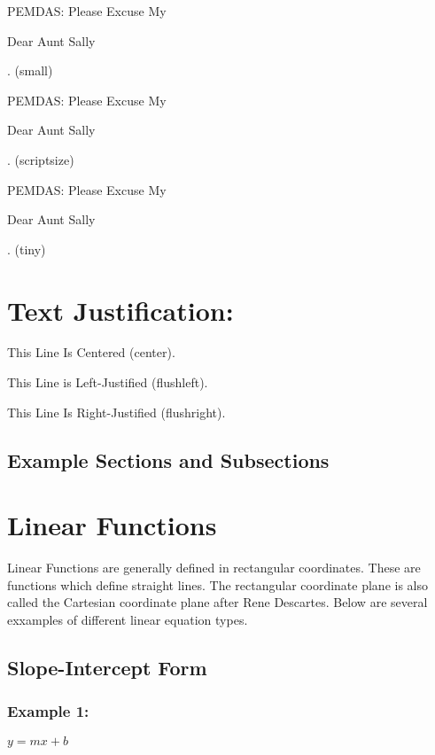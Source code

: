 \documentclass[11pt]{article}
\begin{document}
PEMDAS: Please Excuse My \begin{small}Dear Aunt Sally\end{small}. (small)

PEMDAS: Please Excuse My \begin{scriptsize}Dear Aunt Sally\end{scriptsize}. (scriptsize)

PEMDAS: Please Excuse My \begin{tiny}Dear Aunt Sally\end{tiny}. (tiny)


\section{Text Justification:}
\begin{center}
    This Line Is Centered (center).
\end{center}

\begin{flushleft}
    This Line is Left-Justified (flushleft).
\end{flushleft}

\begin{flushright}
    This Line Is Right-Justified (flushright).
\end{flushright}

\pagebreak

\begin{center}
    \section*{Example Sections and Subsections}
\end{center}

\section{Linear Functions}
    Linear Functions are generally defined in rectangular coordinates. These are functions which define straight
lines. The rectangular coordinate plane is also called the Cartesian coordinate plane after Rene Descartes. Below are
several exxamples of different linear equation types.
    \subsection{Slope-Intercept Form}
        \subsubsection{Example 1:}
            $y = mx + b$
\end{document}
